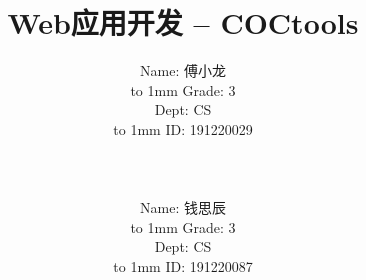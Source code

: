 \documentclass[a4paper,UTF8]{article}
\theoremstyle{definition}
\begin{document}
\begin{CJK}{UTF8}{gkai}
\title{Web应用开发 -- COCtools}
\author{
    \begin{minipage}[b]{0.3\linewidth}
      \begin{flushright}
        Name: 傅小龙\\%
        \vbox to 1mm{}
        Grade: 3%
      \end{flushright}
    \end{minipage}
    \hfill
    \begin{minipage}[b]{0.3\linewidth}
      \begin{flushright}
        Dept: CS\\%
        \vbox to 1mm{}
        ID: 191220029%
      \end{flushright}
    \end{minipage}\\\\
    \begin{minipage}[b]{0.3\linewidth}
      \begin{flushright}
        Name: 钱思辰\\%
        \vbox to 1mm{}
        Grade: 3%
      \end{flushright}
    \end{minipage}
    \hfill
    \begin{minipage}[b]{0.3\linewidth}
      \begin{flushright}
        Dept: CS\\%
        \vbox to 1mm{}
        ID: 191220087%
      \end{flushright}
    \end{minipage}
}
\date{}
\maketitle

\setlength{\baselineskip}{18pt}
\begin{flushleft}
\begin{CJK*}{UTF8}{gbsn}

\end{CJK*}
\end{flushleft}
\end{CJK}
\end{document}

